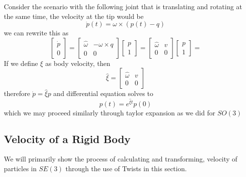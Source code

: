 \documentclass[letterpaper]{article}
\begin{document}
Consider the scenario with the following joint that is translating and
rotating at the same time, the velocity at the tip would be
\begin{equation*}
    \dot{p}(t) = \omega \times (p(t) - q)
\end{equation*}
we can rewrite this as
\begin{equation*}
  \begin{bmatrix}
    \dot{p} \\ 0
  \end{bmatrix} = 
  \begin{bmatrix}
    \widehat{\omega} & -\omega \times q \\ 0 & 0
  \end{bmatrix}
  \begin{bmatrix}
    p \\ 1  
  \end{bmatrix} = 
  \begin{bmatrix}
    \widehat{\omega} & v \\ 0 & 0
  \end{bmatrix}
  \begin{bmatrix}
    p \\ 1  
  \end{bmatrix} = 
\end{equation*}
If we define $\xi$ as body velocity, then
\begin{equation*}
  \widehat{\xi} = \begin{bmatrix}
    \widehat{\omega} & v \\ 0 & 0
  \end{bmatrix}
\end{equation*}
therefore $\dot{p} = \widehat{\xi} p$ and differential equation solves to
\begin{equation*}
  p(t) = e^{\widehat{\xi}t}p(0)
\end{equation*}
which we may proceed similarly through taylor expansion as we did for $SO(3)$

\subsection{Velocity of a Rigid Body}
We will primarily show the process of calculating and transforming, 
velocity of particles in $SE(3)$ through the use of Twists in this section.
\end{document}
